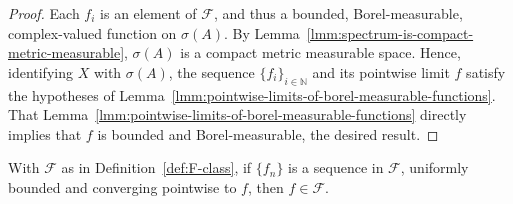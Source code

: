 \begin{proof}
Each $f_i$ is an element of $\mathcal{F}$, and thus a bounded, Borel-measurable, complex-valued function on $\sigma(A)$. By Lemma~\ref{lmm:spectrum-is-compact-metric-measurable}, $\sigma(A)$ is a compact metric measurable space. Hence, identifying $X$ with $\sigma(A)$, the sequence $\{ f_i \}_{i \in \mathbb{N}}$ and its pointwise limit $f$ satisfy the hypotheses of Lemma~\ref{lmm:pointwise-limits-of-borel-measurable-functions}. That Lemma~\ref{lmm:pointwise-limits-of-borel-measurable-functions} directly implies that $f$ is bounded and Borel-measurable, the desired result.
\end{proof}

\begin{proposition}
    \label{prpstn:F-closed-under-limits}
    \leanok
    With $\mathcal{F}$ as in Definition~\ref{def:F-class}, if $\{f_n\}$ is a sequence in $\mathcal{F}$, uniformly bounded and converging pointwise to $f$, then $f \in \mathcal{F}$.
\end{proposition}
